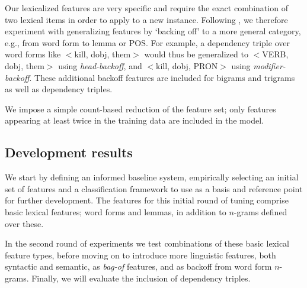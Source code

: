 \documentclass[11pt,letterpaper]{article}
\begin{document}
Our lexicalized features are very specific and require the exact combination of two lexical items in order to apply to a new instance. Following , we therefore experiment with generalizing features by `backing off' to a more general category, e.g., from word form to lemma or POS. For example, a dependency triple over word forms like $<$kill, dobj, them$>$ would thus be generalized to $<$VERB, dobj, them$>$ using \emph{head-backoff}, and $<$kill, dobj, PRON$>$ using \emph{modifier-backoff}. These additional backoff features are included for bigrams and trigrams as well as dependency triples.

We impose a simple count-based reduction of the feature set; only features appearing at least twice in the training data are included in the model.


\subsection{Development results}

We start by defining an informed baseline system, empirically selecting an initial set of features and a classification framework to use as a basis and reference point for further development. The features for this initial round of tuning comprise basic lexical features; word forms and lemmas, in addition to $n$-grams defined over these.

In the second round of experiments we test combinations of these basic lexical feature types, before moving on to introduce more linguistic features, both syntactic and semantic, as \emph{bag-of} features, and as backoff from word form $n$-grams. Finally, we will evaluate the inclusion of dependency triples. %
\end{document}
